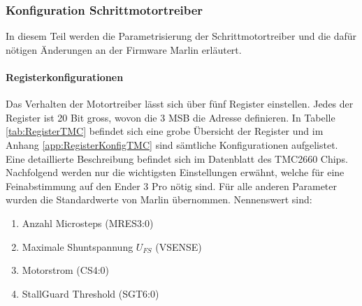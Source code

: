 \subsubsection{Konfiguration Schrittmotortreiber}
\label{sec:Konfiguration_Motortreiber}

In diesem Teil werden die Parametrisierung der Schrittmotortreiber und die dafür nötigen Änderungen an der Firmware Marlin erläutert.

\paragraph{Registerkonfigurationen}
Das Verhalten der Motortreiber lässt sich über fünf Register einstellen. Jedes der Register ist 20 Bit gross, wovon die 3 MSB die Adresse definieren. In Tabelle \ref{tab:RegisterTMC} befindet sich eine grobe Übersicht der Register und im  Anhang \ref{app:RegisterKonfigTMC} sind sämtliche Konfigurationen aufgelistet. Eine detaillierte Beschreibung befindet sich im Datenblatt des TMC2660 Chips. Nachfolgend werden nur die wichtigsten Einstellungen erwähnt, welche für eine Feinabstimmung auf den Ender 3 Pro nötig sind. Für alle anderen Parameter wurden die Standardwerte von Marlin übernommen. Nennenswert sind:

\begin{enumerate}
	\item Anzahl Microsteps (MRES3:0)
	\item Maximale Shuntspannung $U_{FS}$ (VSENSE)
	\item Motorstrom (CS4:0)
	\item StallGuard Threshold (SGT6:0)
\end{enumerate}

